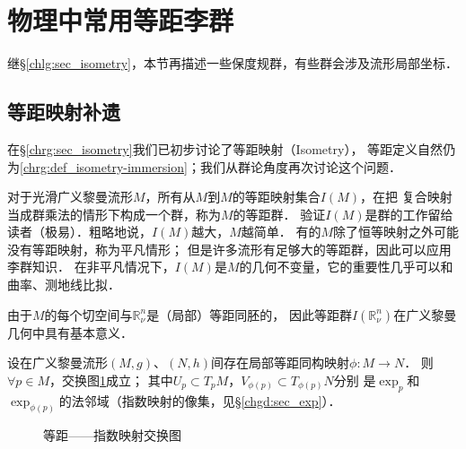 \section{物理中常用等距李群}\label{chlg:sec_matrixG-II}
继\S\ref{chlg:sec_isometry}，本节再描述一些保度规群\cite{tung-1985}，有些群会涉及流形局部坐标．


\subsection{等距映射补遗}\label{chlg:sec_iso-add}
在\S \ref{chrg:sec_isometry}我们已初步讨论了等距映射（Isometry），
等距定义自然仍为\ref{chrg:def_isometry-immersion}；我们从群论角度再次讨论这个问题．


对于光滑广义黎曼流形$M$，所有从$M$到$M$的等距映射集合$I(M)$，在把
复合映射当成群乘法的情形下构成一个群，称为$M$的{\heiti 等距群}．
验证$I(M)$是群的工作留给读者（极易）．粗略地说，$I(M)$越大，$M$越简单．
有的$M$除了恒等映射之外可能没有等距映射，称为平凡情形；
但是许多流形有足够大的等距群，因此可以应用李群知识．
在非平凡情况下，$I(M)$是$M$的几何不变量，它的重要性几乎可以和曲率、测地线比拟．

由于$M$的每个切空间与$\mathbb{R}^n_\nu$是（局部）等距同胚的，
因此等距群$I(\mathbb{R}^n_\nu)$在广义黎曼几何中具有基本意义．

\begin{theorem}\label{chlg:thm_isoexp}
    设在广义黎曼流形$(M,g)$、$(N,h)$间存在局部等距同构映射$\phi:M\to N$．
    则$\forall p\in M$，交换图\ref{chlg:pic_exp-exchange}成立；
    其中$U_p\subset T_pM$，$V_{\phi(p)}\subset T_{\phi(p)}N$分别
    是$\exp_p$和$\exp_{\phi(p)}$的法邻域（指数映射的像集，见\S\ref{chgd:sec_exp}）．
\end{theorem}

\begin{figure}[htb]
    \centering
    \caption{等距——指数映射交换图}\label{chlg:pic_exp-exchange}
\end{figure}

